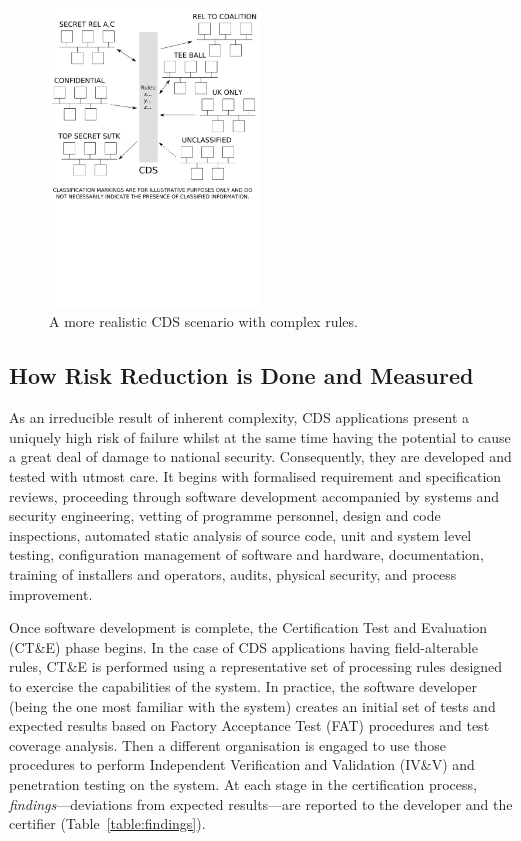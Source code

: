 \documentclass[10pt,letterpaper,conference,compsocconf]{IEEEtran}
\begin{document}
\begin{figure}[htbp]
    \centering
	\includegraphics[width=0.5\textwidth,trim=0 12.25cm 0 0,clip]{complex-CDS.pdf}
	\caption{A more realistic CDS scenario with complex rules.}
	\label{figure:complex-CDS}
\end{figure}

\subsection{How Risk Reduction is Done and Measured}

As an irreducible result of inherent complexity, CDS
applications present a uniquely high
risk of failure whilst at the same time having the potential to cause
a great deal of damage to national security.  Consequently, they are
developed and tested with utmost care.  It begins with formalised
requirement and specification reviews, proceeding through software
development accompanied by systems and security engineering,
vetting of programme personnel, design and code inspections,
automated static analysis of source code, unit and system level
testing, configuration management of software and hardware, documentation,
training of installers and operators, audits, physical security, and
process improvement\cite{Anderson2008a,Fagan1976}.

Once software development is complete, the Certification Test
and Evaluation (CT\&E) phase
begins.
In the case of CDS applications having field-alterable rules,
CT\&E is performed using a representative set of processing rules
designed to exercise the capabilities of the system.
In practice, the software developer (being the one most familiar with the system)
creates an initial set of tests and expected results based on Factory
Acceptance Test (FAT) procedures and test coverage analysis.  Then a
different organisation is engaged to use
those procedures to perform Independent Verification and Validation
(IV\&V) and penetration testing on the system.  At each stage in the
certification process,
{\it findings}---deviations from expected results---are reported to the
developer and the certifier (Table~\ref{table:findings}).
\end{document}
